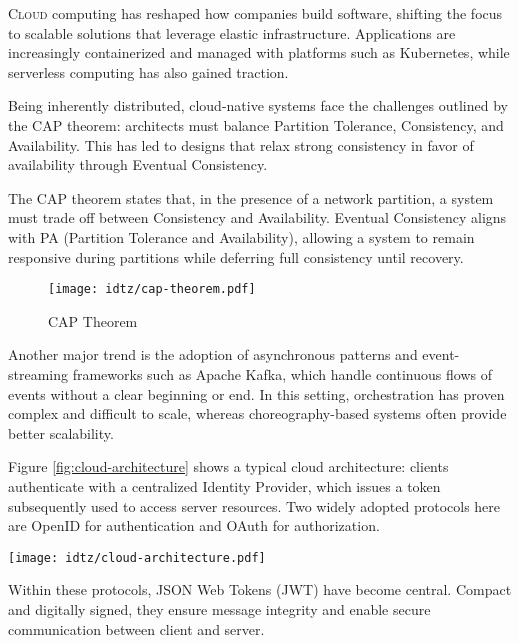 \lettrine{C}{loud} computing has reshaped how companies build software, shifting the focus to scalable solutions that leverage elastic infrastructure. 
Applications are increasingly containerized and managed with platforms such as Kubernetes, while serverless computing has also gained traction.  

\vspace{0.5em} Being inherently distributed, cloud-native systems face the challenges outlined by the CAP theorem: architects must balance Partition Tolerance, Consistency, and Availability. 
This has led to designs that relax strong consistency in favor of availability through Eventual Consistency.  

\begin{boxF}
    The CAP theorem \cite{c1} states that, in the presence of a network partition, a system must trade off between Consistency and Availability. 
    Eventual Consistency aligns with PA (Partition Tolerance and Availability), allowing a system to remain responsive during partitions while deferring full consistency until recovery. 
\end{boxF}

\begin{figure}[h]
    \centering
    \texttt{[image: idtz/cap-theorem.pdf]}
    \caption{CAP Theorem}
    \label{fig:cap-theorem}
\end{figure}

Another major trend is the adoption of asynchronous patterns and event-streaming frameworks such as Apache Kafka, which handle continuous flows of events without a clear beginning or end.  
In this setting, orchestration has proven complex and difficult to scale, whereas choreography-based systems often provide better scalability.  

Figure \ref{fig:cloud-architecture} shows a typical cloud architecture: clients authenticate with a centralized Identity Provider, which issues a token subsequently used to access server resources. 
Two widely adopted protocols here are OpenID \cite{c4} for authentication and OAuth \cite{c5} for authorization.  

\begin{figure*}[htbp]
    \centering
    \texttt{[image: idtz/cloud-architecture.pdf]}
    \caption{Cloud Architecture}
    \label{fig:cloud-architecture}
\end{figure*}

\vspace{0.5em} Within these protocols, JSON Web Tokens (JWT) \cite{c6} have become central. 
Compact and digitally signed, they ensure message integrity and enable secure communication between client and server.  

